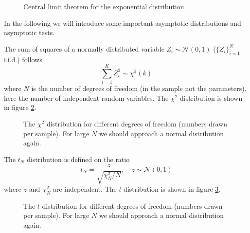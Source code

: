\begin{figure}[!htb]
    \centering
    
    \caption{Central limit theorem for the exponential distribution.}
    \label{fig:clt_exponential}
\end{figure}



In the following we will introduce some important asymptotic distributions and asymptotic tests.

The sum of squares of a normally distributed variable $Z_i \sim \mathcal{N}(0,1)$ ($\{ Z_i \}_{i=1}^N$ i.i.d.) follows
\begin{equation}
    \sum_{i=1}^K Z_i^2 \sim \chi^2(k)
\end{equation}
where $N$ is the number of degrees of freedom (in the sample not the parameters),
here the number of independent random variables. The $\chi^2$ distribution is shown in figure \ref{fig:chi2}.

\begin{figure}[!htb]
    \centering
    
    \caption{The $\chi^2$ distribution for different degrees of freedom (numbers drawn per sample). For large $N$ we should approach a normal distribution again.}
    \label{fig:chi2}
\end{figure}

The $t_N$ distribution is defined on the ratio
\begin{equation}
    t_N = \frac{z}{\sqrt{\chi_N^2 / N}}, \quad z \sim \mathcal{N}(0,1)
\end{equation}
where $z$ and $\chi_N^2$ are independent. The $t$-distribution is shown in figure \ref{fig:t_dist}.

\begin{figure}[!htb]
    \centering
    
    \caption{The $t$-distribution for different degrees of freedom (numbers drawn per sample). For large $N$ we should approach a normal distribution again.}
    \label{fig:t_dist}
\end{figure}

